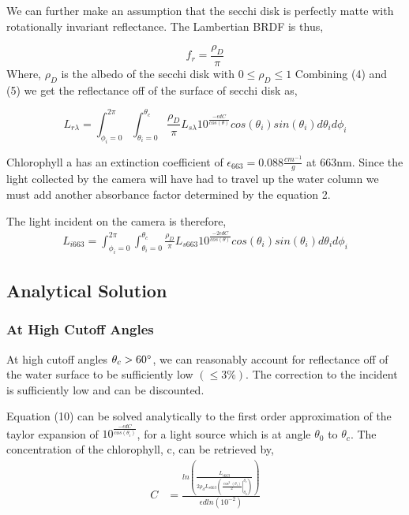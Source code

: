 \documentclass{article}
\begin{document}
We can further make an assumption that the secchi disk is perfectly matte with rotationally
invariant reflectance. The Lambertian BRDF is thus,

\begin{equation}
  f_r = \frac{\rho_D}{\pi}
\end{equation}
Where, $ \rho_D$ is the albedo of the secchi disk with $ 0 \leq \rho_D \leq 1$
Combining (4) and (5) we get the reflectance off of the surface of secchi disk as,

\begin{equation}
  L_{r \lambda} = \int^{2\pi}_{\phi_i = 0}\int^{\theta_c}_{\theta_i = 0}
  \frac{\rho_D}{\pi} L_{s\lambda} 10^\frac{-\epsilon d C}{cos(\theta)}cos(\theta_i)sin(\theta_i)d\theta_i d\phi_i
\end{equation}

Chlorophyll a has an extinction coefficient of $ \epsilon_{663} = 0.088 \frac{cm^{-1}}{g}$ at 663nm.
Since the light collected by the camera will have had to travel up the water column we must add
another absorbance factor determined by the equation 2.

The light incident on the camera is therefore,
\begin{align}
  L_{i 663} = \int^{2\pi}_{\phi_i = 0}\int^{\theta_c}_{\theta_i = 0}
  \frac{\rho_D}{\pi}  L_{s 663} 10^\frac{-2\epsilon d C}{cos(\theta)}cos(\theta_i)sin(\theta_i)d\theta_i d\phi_i
\end{align}
\subsection{Analytical Solution}
\subsubsection{At High Cutoff Angles}
At high cutoff angles $ \theta_c > 60 \degree$, we can reasonably account for reflectance off
of the water surface to be sufficiently low $ (\leq 3\%)$. The correction to the incident is
sufficiently low and can be discounted.

Equation (10) can be solved analytically to the first order approximation of the taylor expansion of
$10^{\frac{-\epsilon dC}{cos(\theta_i)}}$, for a light source which is at angle $\theta_0$ to $ \theta_{c}$.
The concentration of the chlorophyll, c, can be retrieved by,
\begin{align}
  C &= \frac{ln \left (\frac{L_{i663}}{2\rho_dL_{s663} \left(\left. \frac{\cos^2(\theta_i)}{2} \right \rvert_{\theta_0}^{\theta_c}\right) } \right)}{\epsilon d ln(10^{-2})}
\end{align}
\end{document}
